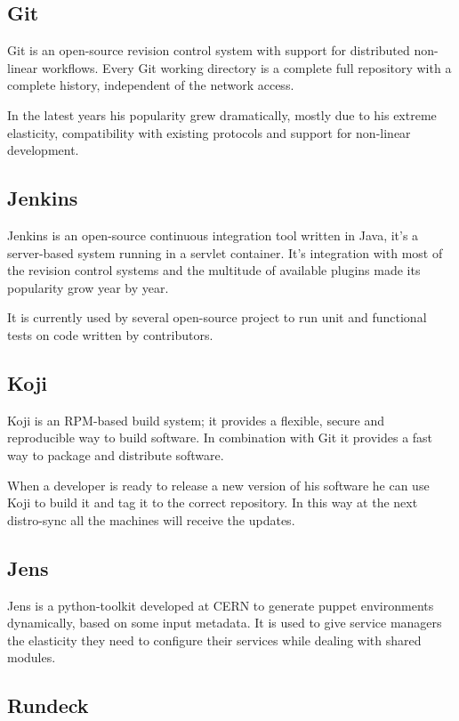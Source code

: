 \subsection{Git}

Git is an open-source revision control system with support for distributed
non-linear workflows. Every Git working directory is a complete full
repository with a complete history, independent of the network access.

In the latest years his popularity grew dramatically, mostly due to his
extreme elasticity, compatibility with existing protocols and support for
non-linear development.

\subsection{Jenkins}

Jenkins is an open-source continuous integration tool written in Java,
it's a server-based system running in a servlet container. It's
integration with most of the revision control systems and the multitude of
available plugins made its popularity grow year by year.

It is currently used by several open-source project to run unit and
functional tests on code written by contributors.

\subsection{Koji}

Koji is an RPM-based build system; it provides a flexible, secure and
reproducible way to build software. In combination with Git it provides
a fast way to package and distribute software.

When a developer is ready to release a new version of his software he can
use Koji to build it and tag it to the correct repository. In this way at
the next distro-sync all the machines will receive the updates.

\subsection{Jens}

Jens is a python-toolkit developed at CERN to generate puppet environments
dynamically, based on some input metadata. It is used to give service
managers the elasticity they need to configure their services while
dealing with shared modules.

\subsection{Rundeck}

